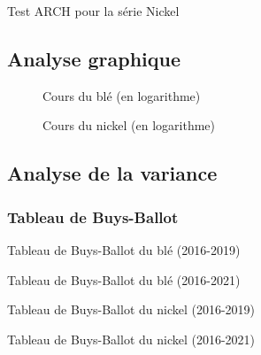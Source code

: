 \documentclass[12pt,a4paper]{article}
\begin{document}
\begin{table}[H]
    \centering
    \caption{Test ARCH pour la série Nickel}
    \label{tab:hetero_nickel}
    \sffamily
    
\end{table}

\subsection{Analyse graphique}
\begin{figure}[H]
    \centering
    \resizebox{0.8\textwidth}{!}{}
    \caption{Cours du blé (en logarithme)}
    \label{fig:ble_log}
\end{figure}
\begin{figure}[H]
    \centering
    \resizebox{0.8\textwidth}{!}{}
    \caption{Cours du nickel (en logarithme)}
    \label{fig:nickel_log}
\end{figure}

\subsection{Analyse de la variance}
\subsubsection{Tableau de Buys-Ballot}\label{appendix:bb}
\begin{table}[H]
    \centering
    \caption{Tableau de Buys-Ballot du blé (2016-2019) }
    \label{tab:bb_ble19}
    \sffamily
    \resizebox{\textwidth}{!}{}
\end{table}
\begin{table}[H]
    \centering
    \caption{Tableau de Buys-Ballot du blé (2016-2021) }
    \label{tab:bb_ble21}
    \sffamily
    \resizebox{\textwidth}{!}{}
\end{table}
\begin{table}[H]
    \centering
    \caption{Tableau de Buys-Ballot du nickel (2016-2019) }
    \label{tab:bb_nickel19}
    \sffamily
    \resizebox{\textwidth}{!}{}
\end{table}
\begin{table}[H]
    \centering
    \caption{Tableau de Buys-Ballot du nickel (2016-2021) }
    \label{tab:bb_nickel21}
    \sffamily
    \resizebox{\textwidth}{!}{}
\end{table}
\clearpage
\end{document}
